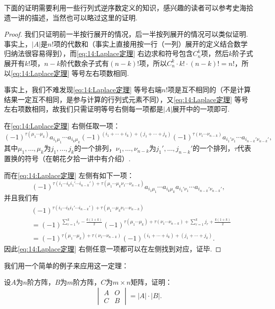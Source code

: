 下面的证明需要利用一些行列式逆序数定义的知识，感兴趣的读者可以参考史海拾遗一讲的描述，当然也可以略过这里的证明.

\begin{proof}
    我们只证明前一半按行展开的情况，后一半按列展开的情况可以类似证明. 事实上，$|A|$是$n!$项的代数和（事实上直接用按一行（一列）展开的定义结合数学归纳法很容易得到），而\autoref{eq:14:Laplace定理} 右边求和符号包含$C_n^k$项，然后$k$阶子式展开有$k!$项，$n-k$阶代数余子式有$(n-k)!$项，所以$C_n^k\cdot k!\cdot (n-k)!=n!$，所以\autoref{eq:14:Laplace定理} 等号左右项数相同.

    事实上，我们不难发现\autoref{eq:14:Laplace定理} 等号右端$n!$项是互不相同的（不是计算结果一定互不相同，是参与计算的行列式元素不同），又\autoref{eq:14:Laplace定理} 等号左右项数相同，故我们只需证明等号右侧每一项都是$|A|$展开中的一项即可.

    在\autoref{eq:14:Laplace定理} 右侧任取一项：
    \[(-1)^{\tau(\mu_1\cdots\mu_k)}a_{i_1\mu_1}\cdots a_{i_k\mu_k}(-1)^{(i_1+\cdots+i_k)+(j_1+\cdots+j_k)}(-1)^{\tau(\nu_1\cdots\nu_{n-k})}a_{i_1'\nu_1}\cdots a_{i_{n-k}'\nu_{n-k}'},\]
    其中$\mu_1,\ldots,\mu_k$为$j_1,\ldots,j_k$的一个排列，$\nu_1,\ldots,\nu_{n-k}$为$j_1',\ldots,j_{n-k}'$的一个排列，$\tau$代表置换的符号（在朝花夕拾一讲中有介绍）.

    而在\autoref{eq:14:Laplace定理} 左侧有如下一项：
    \[(-1)^{\tau(i_1\cdots i_ki_1'\cdots i_{n-k}')+\tau(\mu_1\cdots\mu_k\nu_1\cdots\nu_{n-k})}a_{i_1\mu_1}\cdots a_{i_k\mu_k}a_{i_1'\nu_1}\cdots a_{i_{n-k}'\nu_{n-k}'},\]
    并且我们有
    \begin{align*}
         & (-1)^{\tau(i_1\cdots i_ki_1'\cdots i_{n-k}')+\tau(\mu_1\cdots\mu_k\nu_1\cdots\nu_{n-k})}                                                        \\
         & =(-1)^{\sum\limits_{r=1}^ki_r-\frac{k(1+k)}{2}}(-1)^{\tau(\mu_1\cdots\mu_k)+\tau(\nu_1\cdots\nu_{n-k})+\sum\limits_{r=1}^kj_r+\frac{k(1+k)}{2}} \\
         & =(-1)^{\tau(\mu_1\cdots\mu_k)+\tau(\nu_1\cdots\nu_{n-k})}(-1)^{(i_1+\cdots+i_k)+(j_1+\cdots+j_k)}.
    \end{align*}
    因此\autoref{eq:14:Laplace定理} 右侧任意一项都可以在左侧找到对应，证毕.
\end{proof}

我们用一个简单的例子来应用这一定理：
\begin{example}{}{}
    设$A$为$n$阶方阵，$B$为$m$阶方阵，$C$为$m\times n$矩阵，证明：
    \[ \begin{vmatrix}
            A & O \\
            C & B
        \end{vmatrix}=|A|\cdot|B|. \]
\end{example}

